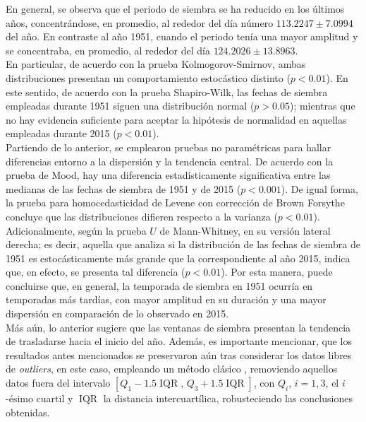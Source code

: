 En general, se observa que el periodo de siembra se ha reducido en los últimos años, concentrándose, en promedio, al rededor del día número $113.2247\pm 7.0994$ del año. En contraste al año 1951, cuando el periodo tenía una mayor amplitud y se concentraba, en promedio, al rededor del día $124.2026 \pm 13.8963$. \\

En particular, de acuerdo con la prueba Kolmogorov-Smirnov, ambas distribuciones presentan un comportamiento estocástico distinto ($p<0.01$). En este sentido, de acuerdo con la prueba Shapiro-Wilk, las fechas de siembra empleadas durante 1951 siguen una distribución normal ($p>0.05$); mientras que no hay evidencia suficiente para aceptar la hipótesis de normalidad en aquellas empleadas durante 2015 ($p<0.01$).\\

Partiendo de lo anterior, se emplearon pruebas no paramétricas para hallar diferencias entorno a la dispersión y la tendencia central. De acuerdo con la prueba de Mood, hay una diferencia estadísticamente significativa entre las medianas de las fechas de siembra de 1951 y de 2015 ($p<0.001$). De igual forma, la prueba para homocedasticidad de Levene con corrección de Brown Forsythe concluye que las distribuciones difieren respecto a la varianza ($p<0.01$).\\

Adicionalmente, según la prueba $U$ de Mann-Whitney, en su versión lateral derecha; es decir, aquella que analiza si la distribución de las fechas de siembra de 1951 es estocásticamente más grande que la correspondiente al año 2015, indica que, en efecto, se presenta tal diferencia ($p<0.01$). Por esta manera, puede concluirse que, en general, la temporada de siembra en 1951 ocurría en temporadas más tardías, con mayor amplitud en su duración y una mayor dispersión en comparación de lo observado en 2015.\\

Más aún, lo anterior sugiere que las ventanas de siembra presentan la tendencia de trasladarse hacia el inicio del año. Además, es importante mencionar, que los resultados antes mencionados se preservaron aún tras considerar los datos libres de \textit{outliers}, en este caso, empleando un método clásico \cite{Lin_2025}, removiendo aquellos datos fuera del intervalo $[Q_1-1.5 \operatorname{IQR},\,Q_3+1.5 \operatorname{IQR}]$, con $Q_i$, $i=1,3$, el $i$-ésimo cuartil y $\operatorname{IQR}$ la distancia intercuartílica, robusteciendo las conclusiones obtenidas.\\



